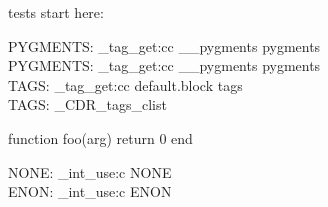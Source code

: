 
\ExplSyntaxOff
\makeatother

\bgroup

tests start here:


\ExplSyntaxOn
PYGMENTS: \CDR_tag_get:cc { __pygments } { pygments } \\
\ExplSyntaxOff
{}
\ExplSyntaxOn
PYGMENTS: \CDR_tag_get:cc { __pygments } { pygments } \\
TAGS: \CDR_tag_get:cc { default.block } { tags } \\
TAGS: \g_CDR_tags_clist \\
\ExplSyntaxOff
\begin{CDRBlock}[
  stepnumber=1,
]
function foo(arg) return 0 end
\end{CDRBlock}
\ExplSyntaxOn
NONE: \CDR_int_use:c { NONE } \\
ENON: \CDR_int_use:c { ENON } \\
\ExplSyntaxOff

